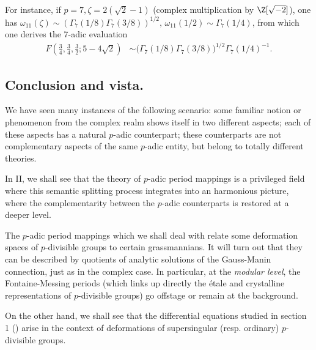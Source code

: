 \begin{para}
\begin{itemize}
       \noindent For instance, if $p=7, \zeta = 2(\sqrt{2} -1)$ (complex
       multiplication by ${\Z}[\sqrt{-2}]$), one has $\omega_{11}(\zeta) \sim
       (\Gamma_7(1/8)\Gamma_7(3/8))^{1/2},\,\omega_{11}(1/2) \sim
       \Gamma_7(1/4) $, from which
       one derives the 7-adic evaluation
       \begin{align*}
	F\left(\frac{3}{4},\frac{3}{4},\frac{3}{2};5-4\sqrt{2}\right) & \sim
	 \bigl(\Gamma_7(1/8)\Gamma_7(3/8)\bigr)^{1/2}\Gamma_7(1/4)^{-1}.
       \end{align*}
\end{itemize}
\end{para}

\subsection{Conclusion and vista.}
We have seen many instances of the following scenario: some familiar
notion or phenomenon from the complex realm shows itself in two
different aspects; each of these aspects has a natural $p$-adic
counterpart; these counterparts are not complementary aspects of the
same $p$-adic entity, but belong to totally different theories.  

In II, we shall see that the theory of $p$-adic period mappings is a privileged
field where this semantic splitting process integrates into an
harmonious picture, where the complementarity between the $p$-adic
counterparts is restored at a deeper level.

The $p$-adic period mappings which we shall deal with relate some
deformation spaces of $p$-divisible groups to certain grassmannians. It
will turn out that they can be described by quotients of analytic
solutions of the Gauss-Manin connection, just as in the complex case. In
particular, at the {\it modular level}, the Fontaine-Messing periods
(which links up directly the \'etale and crystalline representations of
$p$-divisible groups) go offstage or remain at the background.

On the other hand, we shall see that the differential equations
studied in section 1 () arise in the context of deformations of
supersingular (resp. ordinary) $p$-divisible groups.
